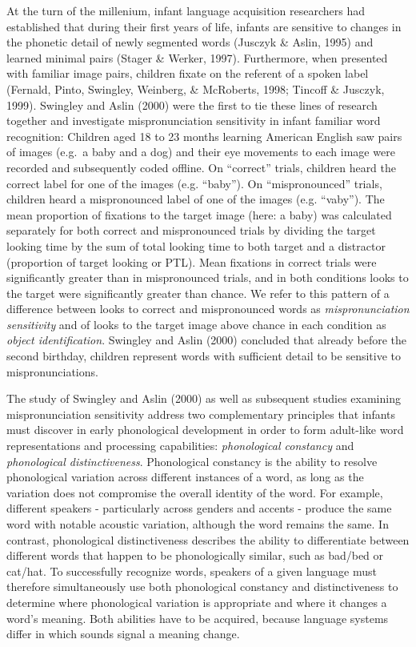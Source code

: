 \documentclass[man]{apa6}
\theoremstyle{definition}
\theoremstyle{definition}
\theoremstyle{definition}
\theoremstyle{remark}
\begin{document}
At the turn of the millenium, infant language acquisition researchers
had established that during their first years of life, infants are
sensitive to changes in the phonetic detail of newly segmented words
(Jusczyk \& Aslin, 1995) and learned minimal pairs (Stager \& Werker,
1997). Furthermore, when presented with familiar image pairs, children
fixate on the referent of a spoken label (Fernald, Pinto, Swingley,
Weinberg, \& McRoberts, 1998; Tincoff \& Jusczyk, 1999). Swingley and
Aslin (2000) were the first to tie these lines of research together and
investigate mispronunciation sensitivity in infant familiar word
recognition: Children aged 18 to 23 months learning American English saw
pairs of images (e.g.~a baby and a dog) and their eye movements to each
image were recorded and subsequently coded offline. On \enquote{correct}
trials, children heard the correct label for one of the images (e.g.
\enquote{baby}). On \enquote{mispronounced} trials, children heard a
mispronounced label of one of the images (e.g. \enquote{vaby}). The mean
proportion of fixations to the target image (here: a baby) was
calculated separately for both correct and mispronounced trials by
dividing the target looking time by the sum of total looking time to
both target and a distractor (proportion of target looking or PTL). Mean
fixations in correct trials were significantly greater than in
mispronounced trials, and in both conditions looks to the target were
significantly greater than chance. We refer to this pattern of a
difference between looks to correct and mispronounced words as
\emph{mispronunciation sensitivity} and of looks to the target image
above chance in each condition as \emph{object identification}. Swingley
and Aslin (2000) concluded that already before the second birthday,
children represent words with sufficient detail to be sensitive to
mispronunciations.

The study of Swingley and Aslin (2000) as well as subsequent studies
examining mispronunciation sensitivity address two complementary
principles that infants must discover in early phonological development
in order to form adult-like word representations and processing
capabilities: \emph{phonological constancy} and \emph{phonological
distinctiveness}. Phonological constancy is the ability to resolve
phonological variation across different instances of a word, as long as
the variation does not compromise the overall identity of the word. For
example, different speakers - particularly across genders and accents -
produce the same word with notable acoustic variation, although the word
remains the same. In contrast, phonological distinctiveness describes
the ability to differentiate between different words that happen to be
phonologically similar, such as bad/bed or cat/hat. To successfully
recognize words, speakers of a given language must therefore
simultaneously use both phonological constancy and distinctiveness to
determine where phonological variation is appropriate and where it
changes a word's meaning. Both abilities have to be acquired, because
language systems differ in which sounds signal a meaning change.
\end{document}
